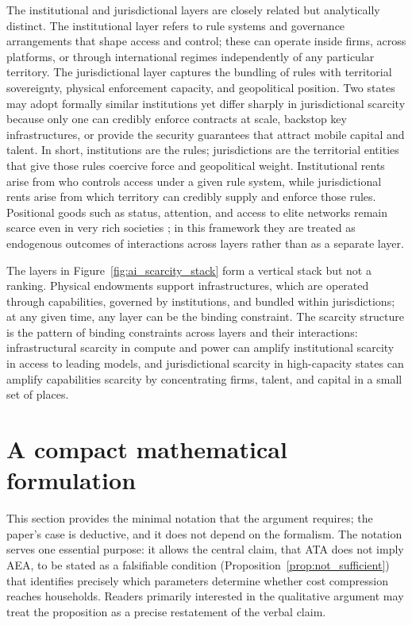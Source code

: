 \documentclass[11pt]{article}
\begin{document}
The institutional and jurisdictional layers are closely related but analytically distinct. The institutional layer refers to rule systems and governance arrangements that shape access and control; these can operate inside firms, across platforms, or through international regimes independently of any particular territory. The jurisdictional layer captures the bundling of rules with territorial sovereignty, physical enforcement capacity, and geopolitical position. Two states may adopt formally similar institutions yet differ sharply in jurisdictional scarcity because only one can credibly enforce contracts at scale, backstop key infrastructures, or provide the security guarantees that attract mobile capital and talent. In short, institutions are the rules; jurisdictions are the territorial entities that give those rules coercive force and geopolitical weight. Institutional rents arise from who controls access under a given rule system, while jurisdictional rents arise from which territory can credibly supply and enforce those rules. Positional goods such as status, attention, and access to elite networks remain scarce even in very rich societies \citep{Hirsch1995}; in this framework they are treated as endogenous outcomes of interactions across layers rather than as a separate layer.

The layers in Figure~\ref{fig:ai_scarcity_stack} form a vertical stack but not a ranking. Physical endowments support infrastructures, which are operated through capabilities, governed by institutions, and bundled within jurisdictions; at any given time, any layer can be the binding constraint. The scarcity structure is the pattern of binding constraints across layers and their interactions: infrastructural scarcity in compute and power can amplify institutional scarcity in access to leading models, and jurisdictional scarcity in high-capacity states can amplify capabilities scarcity by concentrating firms, talent, and capital in a small set of places.

\section{A compact mathematical formulation}
\label{sec:formal}

This section provides the minimal notation that the argument requires; the paper's case is deductive, and it does not depend on the formalism. The notation serves one essential purpose: it allows the central claim, that ATA does not imply AEA, to be stated as a falsifiable condition (Proposition~\ref{prop:not_sufficient}) that identifies precisely which parameters determine whether cost compression reaches households. Readers primarily interested in the qualitative argument may treat the proposition as a precise restatement of the verbal claim.
\end{document}
